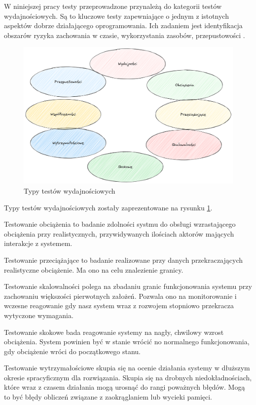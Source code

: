 W niniejszej pracy testy przeprowadzone przynależą do kategorii testów wydajnościowych.
Są to kluczowe testy zapewniające o jednym z istotnych aspektów dobrze działającego oprogramowania.
Ich zadaniem jest identyfikacja obszarów ryzyka zachowania w czasie, wykorzystania zasobów, przepustowości \cite{testerzyTestowanieWydajnoci}.

\begin{figure}[!hb]
	\centering \includegraphics[width=1\linewidth]{rysunki/performance-tests.png}
	\caption{Typy testów wydajnościowych}
	\label{rys:performance-tests}
\end{figure}

Typy testów wydajnościowych zostały zaprezentowane na rysunku \ref{rys:performance-tests}.

Testowanie obciążenia to badanie zdolności systmu do obsługi wzrastającego obciążenia przy realistycznych, przywidywanych ilościach aktorów mających interakcje z systemem.

Testowanie przeciążające to badanie realizowane przy danych przekraczających realistyczne obciążenie. 
Ma ono na celu znalezienie granicy.

Testowanie skalowalności polega na zbadaniu granic funkcjonowania systemu przy zachowaniu większości pierwotnych założeń.
Pozwala ono na monitorowanie i wczesne reagowanie gdy nasz system wraz z rozwojem stopniowo przekracza wytyczone wymagania.

Testowanie skokowe bada reagowanie systemy na nagły, chwilowy wzrost obciążenia.
System powinien być w stanie wrócić no normalnego funkcjonowania, gdy obciążenie wróci do początkowego stanu.

Testowanie wytrzymałościowe skupia się na ocenie działania systemy w dłuższym okresie spracyficznym dla rozwiązania.
Skupia się na drobnych niedokładnościach, które wraz z czasem działania mogą urosnąć do rangi poważnych błędów.
Mogą to być błędy obliczeń związane z zaokrąglaniem lub wycieki pamięci.

